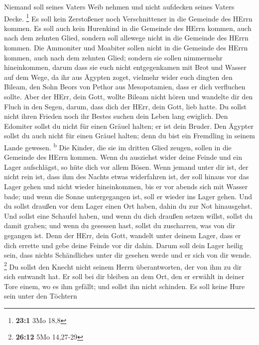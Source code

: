  Niemand soll seines Vaters Weib nehmen und nicht
aufdecken seines Vaters Decke. \footnote{\textbf{23:1} 3Mo 18,8}
 Es soll kein Zerstoßener noch Verschnittener in die
Gemeinde des HErrn kommen.  Es soll auch kein Hurenkind in
die Gemeinde des HErrn kommen, auch nach dem zehnten Glied, sondern soll
allewege nicht in die Gemeinde des HErrn kommen.  Die
Ammoniter und Moabiter sollen nicht in die Gemeinde des HErrn kommen,
auch nach dem zehnten Glied; sondern sie sollen nimmermehr hineinkommen,
 darum dass sie euch nicht entgegenkamen mit Brot und
Wasser auf dem Wege, da ihr aus Ägypten zoget, vielmehr wider euch
dingten den Bileam, den Sohn Beors von Pethor aus Mesopotamien, dass er
dich verfluchen sollte.  Aber der HErr, dein Gott, wollte
Bileam nicht hören und wandelte dir den Fluch in den Segen, darum, dass
dich der HErr, dein Gott, lieb hatte.  Du sollst nicht
ihren Frieden noch ihr Bestes suchen dein Leben lang ewiglich.
 Den Edomiter sollst du nicht für einen Gräuel halten; er
ist dein Bruder. Den Ägypter sollst du auch nicht für einen Gräuel
halten; denn du bist ein Fremdling in seinem Lande gewesen.
\textsuperscript{b}  Die Kinder, die sie im dritten Glied
zeugen, sollen in die Gemeinde des HErrn kommen.  Wenn du
ausziehst wider deine Feinde und ein Lager aufschlägst, so hüte dich vor
allem Bösen.  Wenn jemand unter dir ist, der nicht rein
ist, dass ihm des Nachts etwas widerfahren ist, der soll hinaus vor das
Lager gehen und nicht wieder hineinkommen,  bis er vor
abends sich mit Wasser bade; und wenn die Sonne untergegangen ist, soll
er wieder ins Lager gehen.  Und du sollst draußen vor dem
Lager einen Ort haben, dahin du zur Not hinausgehst.  Und
sollst eine Schaufel haben, und wenn du dich draußen setzen willst,
sollst du damit graben; und wenn du gesessen hast, sollst du zuscharren,
was von dir gegangen ist.  Denn der HErr, dein Gott,
wandelt unter deinem Lager, dass er dich errette und gebe deine Feinde
vor dir dahin. Darum soll dein Lager heilig sein, dass nichts
Schändliches unter dir gesehen werde und er sich von dir wende.
\footnote{\textbf{26:12} 5Mo 14,27-29}  Du sollst den
Knecht nicht seinem Herrn überantworten, der von ihm zu dir sich
entwandt hat.  Er soll bei dir bleiben an dem Ort, den er
erwählt in deiner Tore einem, wo es ihm gefällt; und sollst ihn nicht
schinden.  Es soll keine Hure sein unter den Töchtern
